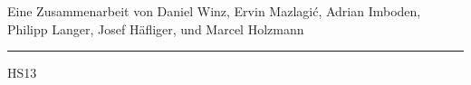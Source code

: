 \documentclass[a5paper,10pt,fleqn]{book}
\makeatletter
\newcommand*{\rom}[1]{\expandafter\@slowromancap\romannumeral #1@}
\makeatother
\begin{document}
\vfill{}

\begin{large}
	\begin{center}
		\normalfont
		\noindent
		Eine Zusammenarbeit von
			Daniel Winz,
			Ervin Mazlagi\'c,
			Adrian Imboden,
			Philipp Langer,
			Josef Häfliger,
			und
			Marcel Holzmann
	\end{center}
\end{large}

\begin{large}	
	\noindent\rule{\textwidth}{2pt}
	\begin{center}
		\noindent
		HS13
	\end{center}
\end{large}
\end{document}
